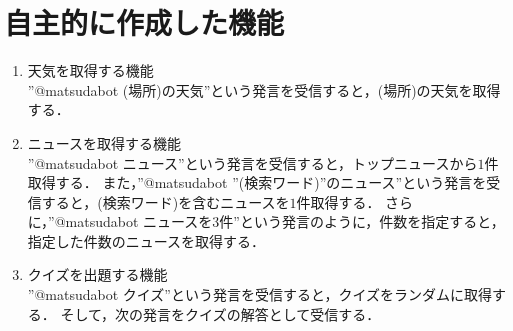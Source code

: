 \documentclass[12pt]{jsarticle}
\begin{document}
\section{自主的に作成した機能}
\begin{enumerate}
\item 天気を取得する機能\\
''@matsudabot (場所)の天気''という発言を受信すると，(場所)の天気を取得する．
\item ニュースを取得する機能\\
''@matsudabot ニュース''という発言を受信すると，トップニュースから$1$件取得する．
また，''@matsudabot ''(検索ワード)''のニュース''という発言を受信すると，(検索ワード)を含むニュースを$1$件取得する．
さらに，''@matsudabot ニュースを3件''という発言のように，件数を指定すると，指定した件数のニュースを取得する．
\item クイズを出題する機能\\
''@matsudabot クイズ''という発言を受信すると，クイズをランダムに取得する．
そして，次の発言をクイズの解答として受信する．
\end{enumerate}



\end{document}
